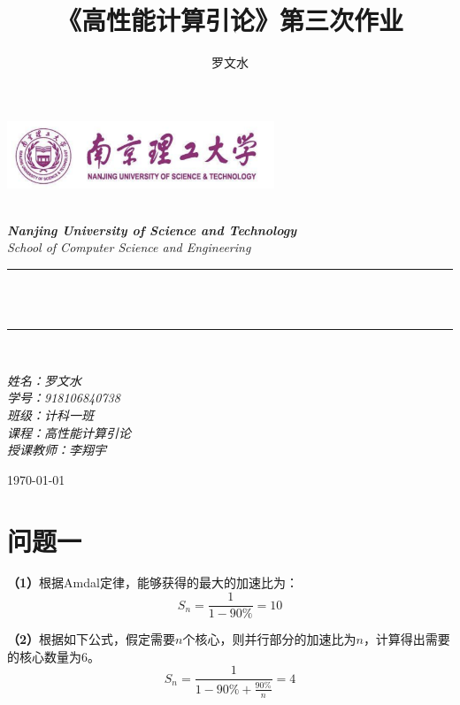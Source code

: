 \documentclass[12pt]{article}
\title{《高性能计算引论》第三次作业}
\author{\textup{罗文水}}
\begin{document}
	\begin{titlepage}
		\newcommand{\HRule}{\rule{\linewidth}{0.5mm}}
		\begin{center}
			\includegraphics[width=8cm]{../HPC_P1/title}			
		\end{center}
		
		\center 
		\quad\\[1.5cm]
		\textsl{\Large \textbf{Nanjing University of Science and Technology} }\\[0.5cm] 
		\textsl{\large School of Computer Science and Engineering}\\[0.5cm] 
		\makeatletter
		\HRule \\[0.4cm]
		{ \huge \bfseries \@title}\\[0.25cm] 
		\HRule \\[1.5cm]
	\begin{minipage}{0.42\textwidth}
		\begin{flushleft}
			
			\Large{\emph{姓名：罗文水}}
			\\
			\Large{\emph{学号：918106840738}}
			\\
			\Large{\emph{班级：计科一班}}
			\\
			\Large{\emph{课程：高性能计算引论}}
			\\
			\Large{\emph{授课教师：李翔宇}}
			\\
		\end{flushleft}
	\end{minipage}
		\vspace{7em} 
		
		{\large \today}\\[2cm] 
		\vfill 
	\end{titlepage}
	
	\newpage
\section{问题一}
\textbf{（1）}根据Amdal定律，能够获得的最大的加速比为：
\begin{equation}
	S_{n}=\frac{1}{1-90\%}=10
\end{equation}

\textbf{（2）}根据如下公式，假定需要$n$个核心，则并行部分的加速比为$n$，计算得出需要的核心数量为6。
\begin{equation}
	S_{n}=\frac{1}{1-90\%+\frac{90\%}{n}}=4
\end{equation}
\end{document}
